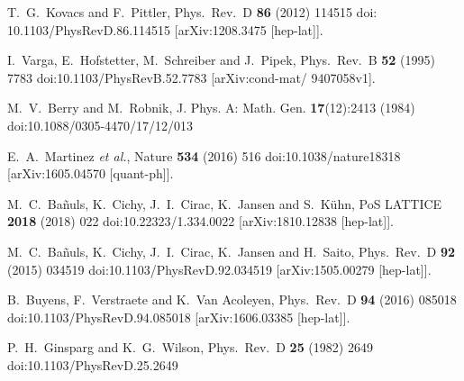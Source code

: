\documentclass[12pt,a4paper]{article}
\begin{document}
\begin{thebibliography}{9}
  T.~G.~Kovacs and F.~Pittler,
  Phys.\ Rev.\ D {\bf 86} (2012) 114515
  doi: 10.1103/PhysRevD.86.114515
  [arXiv:1208.3475 [hep-lat]].
  
  I.~Varga, E.~Hofstetter, M.~Schreiber and J.~Pipek,
  Phys.\ Rev.\ B {\bf 52} (1995) 7783
  doi:10.1103/PhysRevB.52.7783
  [arXiv:cond-mat/ 9407058v1].

  M.~V.~Berry and M.~Robnik,
  J. Phys. A: Math. Gen. {\bf 17}(12):2413 (1984)
  doi:10.1088/0305-4470/17/12/013

  E.~A.~Martinez {\it et al.},
  Nature {\bf 534} (2016) 516
  doi:10.1038/nature18318
  [arXiv:1605.04570 [quant-ph]].

  M.~C.~Bañuls, K.~Cichy, J.~I.~Cirac, K.~Jansen and S.~Kühn,
  PoS LATTICE {\bf 2018} (2018) 022
  doi:10.22323/1.334.0022
  [arXiv:1810.12838 [hep-lat]].
  
  M.~C.~Bañuls, K.~Cichy, J.~I.~Cirac, K.~Jansen and H.~Saito,
  Phys.\ Rev.\ D {\bf 92} (2015) 034519
  doi:10.1103/PhysRevD.92.034519
  [arXiv:1505.00279 [hep-lat]].
  
  B.~Buyens, F.~Verstraete and K.~Van Acoleyen,
  Phys.\ Rev.\ D {\bf 94} (2016) 085018
  doi:10.1103/PhysRevD.94.085018
  [arXiv:1606.03385 [hep-lat]].

  P.~H.~Ginsparg and K.~G.~Wilson,
  Phys.\ Rev.\ D {\bf 25} (1982) 2649
  doi:10.1103/PhysRevD.25.2649
  
\end{thebibliography}
\end{document}
